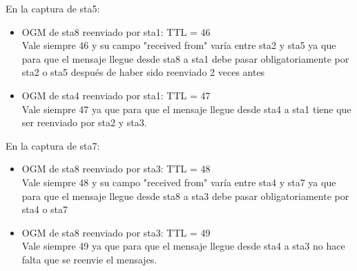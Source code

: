 \documentclass[12pt, a4paper]{report}
\begin{document}
\begin{enumerate}
	En la captura de sta5:\\
	\begin{itemize}
		\item OGM de sta8 reenviado por sta1: TTL = 46\\
		
		Vale siempre 46 y su campo "received from" varía entre sta2 y sta5 ya que para que el mensaje llegue desde sta8 a sta1 debe pasar obligatoriamente por sta2 o sta5 después de haber sido reenviado 2 veces antes
		
		\item OGM de sta4 reenviado por sta1: TTL = 47\\
		
		Vale siempre 47 ya que para que el mensaje llegue desde sta4 a sta1 tiene que ser reenviado por sta2 y sta3.
	\end{itemize}
	
	En la captura de sta7:\\
	\begin{itemize}
		\item OGM de sta8 reenviado por sta3: TTL = 48\\
		
		Vale siempre 48 y su campo "received from" varía entre sta4 y sta7 ya que para que el mensaje llegue desde sta8 a sta3 debe pasar obligatoriamente por sta4 o sta7
		\item OGM de sta8 reenviado por sta3: TTL = 49\\
		
		Vale siempre 49 ya que para que el mensaje llegue desde sta4 a sta3 no hace falta que se reenvie el mensajes.
	\end{itemize}
\end{enumerate}
\end{document}

